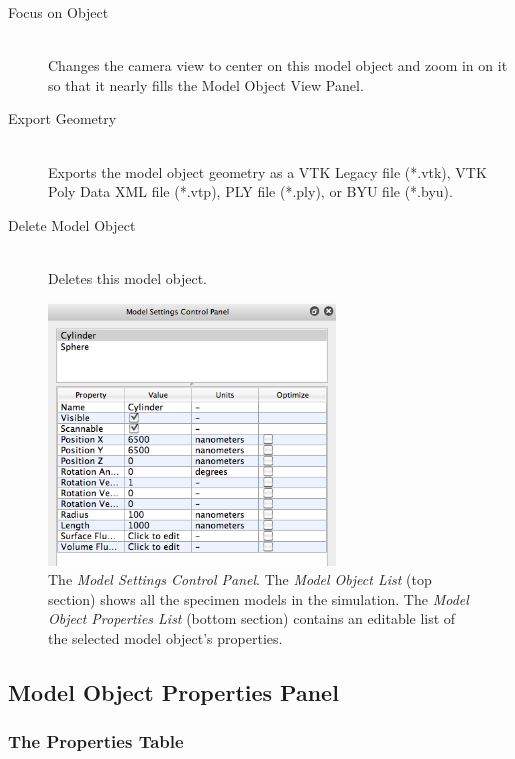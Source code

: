 \documentclass[11pt,titlepage]{article}
\begin{document}
\begin{description}

  \item[Focus on Object] \hfill \\
  Changes the camera view to center on this model object and zoom in on it so that it nearly fills the Model Object View Panel.
  
  \item[Export Geometry] \hfill \\
  Exports the model object geometry as a VTK Legacy file (*.vtk), VTK Poly Data XML file (*.vtp), PLY file (*.ply), or BYU file (*.byu).
  
  \item[Delete Model Object] \hfill \\
  Deletes this model object.

\end{description}

\begin{figure}[htbp] %
   \centering
   \includegraphics[width=3in]{images/ModelObjectProperties} 
   \caption{The \emph{Model Settings Control Panel}. The \emph{Model Object List} (top section) shows all the specimen models in the simulation. The \emph{Model Object Properties List} (bottom section) contains an editable list of the selected model object's properties.}
   \label{fig:example}
\end{figure}

\subsection{Model Object Properties Panel}

\subsubsection{The Properties Table}
\end{document}

